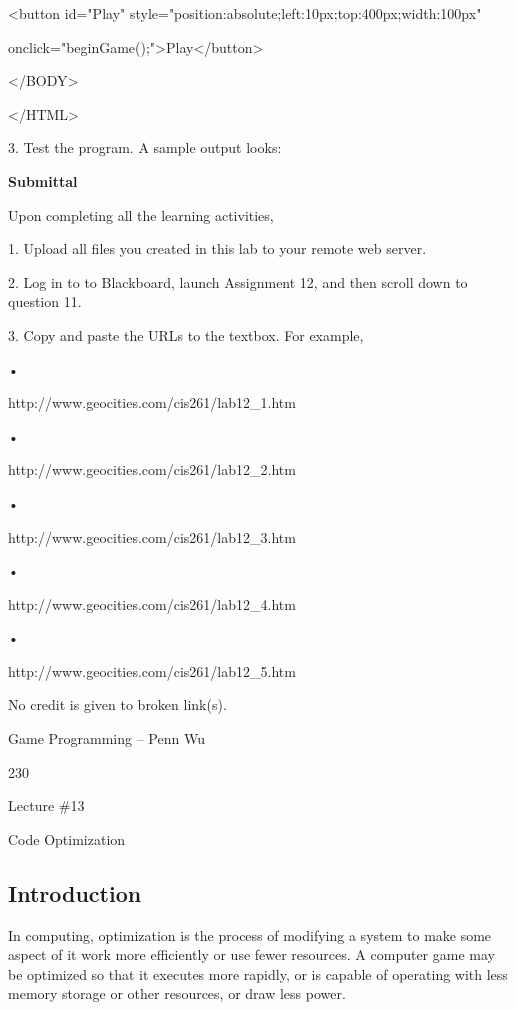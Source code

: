 \documentclass[
]{article}
\begin{document}
\textless button id="Play"
style="position:absolute;left:10px;top:400px;width:100px"

onclick="beginGame();"\textgreater Play\textless/button\textgreater{}

\textless/BODY\textgreater{}

\textless/HTML\textgreater{}

3. Test the program. A sample output looks:

\textbf{Submittal}

Upon completing all the learning activities,

1. Upload all files you created in this lab to your remote web server.

2. Log in to to Blackboard, launch Assignment 12, and then scroll down
to question 11.

3. Copy and paste the URLs to the textbox. For example,

•

http://www.geocities.com/cis261/lab12\_1.htm

•

http://www.geocities.com/cis261/lab12\_2.htm

•

http://www.geocities.com/cis261/lab12\_3.htm

•

http://www.geocities.com/cis261/lab12\_4.htm

•

http://www.geocities.com/cis261/lab12\_5.htm

No credit is given to broken link(s).

Game Programming -- Penn Wu

230

\protect\hypertarget{index_split_011.htmlux5cux23p231}{}{}

Lecture \#13

Code Optimization

\protect\hypertarget{index_split_012.html}{}{}

\hypertarget{index_split_012.htmlux5cux23calibre_pb_11}{%
\subsection{Introduction}\label{index_split_012.htmlux5cux23calibre_pb_11}}

In computing, optimization is the process of modifying a system to make
some aspect of it work more efficiently or use fewer resources. A
computer game may be optimized so that it executes more rapidly, or is
capable of operating with less memory storage or other resources, or
draw less power.
\end{document}
